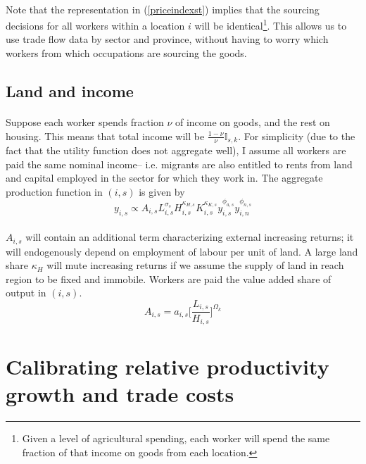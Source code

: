 \documentclass[]{article}
\begin{document}
\paragraph*{}
Note that the representation in (\ref{priceindexst}) implies that the sourcing decisions for all workers within a location $i$ will be identical\footnote{Given a level of agricultural spending, each worker will spend the same fraction of that income on goods from each location.}. This allows us to use trade flow data by sector and province, without having to worry which workers from which occupations are sourcing the goods. 
\subsection{Land and income}
\paragraph*{}
Suppose each worker spends fraction $\nu$ of income on goods, and the rest on housing. This means that total income will be $\frac{1 - \nu}{\nu}\mathbb{I}_{s, k}$. For simplicity (due to the fact that the utility function does not aggregate well), I assume all workers are paid the same nominal income-- i.e. migrants are also entitled to rents from land and capital employed in the sector for which they work in. The aggregate production function in $(i, s)$ is given by
\begin{equation*}
	y_{i, s} \propto A_{i, s}L_{i, s}^{\sigma_{s}}H_{i, s}^{\kappa_{H, s}}K_{i, s}^{\kappa_{K, s}}y_{i, s}^{\phi_{a, s}}y_{i, n}^{\phi_{n, s}}
\end{equation*}
\paragraph*{}
$A_{i, s}$ will contain an additional term characterizing external increasing returns; it will endogenously depend on employment of labour per unit of land. A large land share $\kappa_{H}$ will mute increasing returns if we assume the supply of land in reach region to be fixed and immobile. Workers are paid the value added share of output in $(i, s)$. 
\begin{equation*}
	A_{i, s} = a_{i, s}\bigg[\frac{L_{i, s}}{H_{i, s}}\bigg]^{\Omega_{k}}
\end{equation*}

\section{Calibrating relative productivity growth and trade costs}
\end{document}

